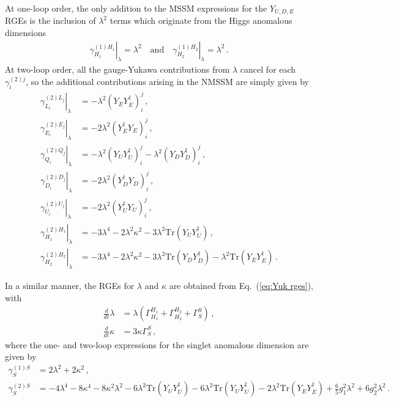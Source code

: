 \documentclass[final,3p,times]{elsarticle}
\newcommand{\lamsq}{\lambda^2}
\newcommand{\kapsq}{\kappa^2}
\newcommand{\tr}{\mathrm{Tr}}
\newcommand{\dt}{\frac{d}{dt}}
\begin{document}
At one-loop order, the only addition to the MSSM expressions 
\cite{MV94} for the $Y_{U,D,E}$ RGEs is the inclusion of $\lamsq$ terms 
which originate from the Higgs anomalous dimensions
%
\begin{align}
\left.\gamma^{(1) H_1}_{H_1}\right|_\lambda = \lamsq 
\quad \mbox{and} \quad \left.\gamma^{(1) H_2}_{H_2} \right|_\lambda = \lamsq\,.
\end{align}
%
At two-loop order, all the gauge-Yukawa contributions from $\lambda$ cancel for 
each $\gamma_i^{(2)j}$, so the additional contributions arising in the NMSSM are 
simply given by
%
\begin{align}
\left.\gamma_{L_i}^{(2)L_j}\right|_\lambda &= -\lamsq (Y_E Y_E^\dagger)_i^j\,, \\
%
\left.\gamma_{E_i}^{(2)E_j}\right|_\lambda &= -2\lamsq (Y_E^\dagger Y_E)_i^j\,, \\
%
\left.\gamma_{Q_i}^{(2)Q_j}\right|_\lambda &= -\lamsq (Y_U Y_U^\dagger)_i^j 
- \lamsq (Y_D Y_D^\dagger)_i^j\,, \\
%
\left.\gamma_{D_i}^{(2)D_j}\right|_\lambda &= -2\lamsq (Y_D^\dagger Y_D)_i^j\,, \\
%
\left.\gamma_{U_i}^{(2)U_j}\right|_\lambda &= -2\lamsq (Y_U^\dagger Y_U)_i^j \,, \\
%
\left.\gamma_{H_1}^{(2)H_1}\right|_\lambda &= -3\lambda^4 -2\lamsq\kapsq 
- 3\lamsq \tr(Y_U Y_U^\dagger)\,, \\
%
\left.\gamma_{H_2}^{(2)H_2}\right|_\lambda &= -3\lambda^4 -2\lamsq\kapsq 
- 3\lamsq \tr(Y_D Y_D^\dagger) - \lamsq \tr(Y_E Y_E^\dagger)\,.
\end{align}
%

In a similar manner, the RGEs for $\lambda$ and $\kappa$ are obtained from Eq.~(\ref{eq:Yuk rges}), with
\begin{align}
\dt\lambda &= \lambda (\Gamma^{H_1}_{H_1} + \Gamma^{H_2}_{H_2} + \Gamma^S_S)\,, \\
%
\dt\kappa &= 3\kappa \Gamma_S^S\,,
\end{align}
%
where the one- and two-loop expressions for the singlet anomalous dimension 
are given by
%
\begin{align}
\gamma_S^{(1)S} &= 2\lamsq + 2\kapsq\,,\\
%
\gamma_S^{(2)S} &= -4\lambda^4 - 8\kappa^4 - 8 \kapsq\lamsq 
- 6\lamsq \tr(Y_UY_U^\dagger) - 6\lamsq \tr(Y_UY_U^\dagger) 
- 2\lamsq \tr(Y_EY_E^\dagger) + \tfrac{6}{5}g_1^2\lamsq + 6g_2^2\lamsq\,.
\end{align} 
\end{document}

